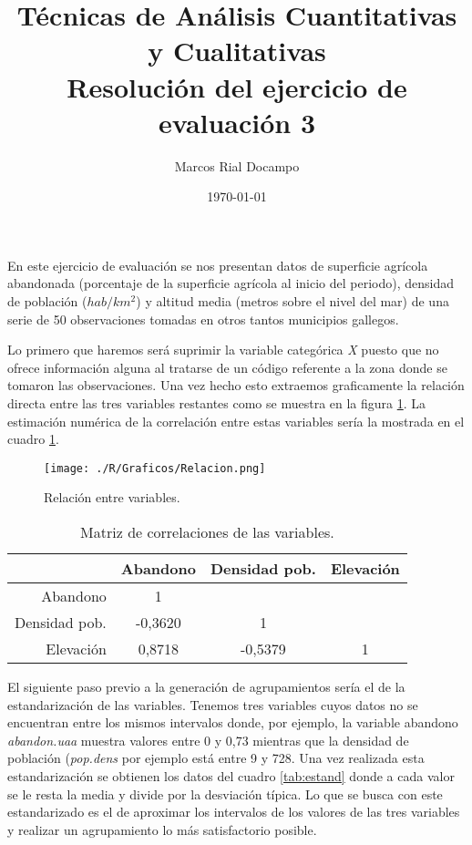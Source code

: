 \documentclass[11pt,a4paper]{article}
\author{Marcos Rial Docampo}
\title{Técnicas de Análisis Cuantitativas y Cualitativas\\Resolución del ejercicio de evaluación 3}
\date{\small{\today}}
\begin{document}
\maketitle

En este ejercicio de evaluación se nos presentan datos de superficie agrícola abandonada (porcentaje de la superficie agrícola al inicio del periodo), densidad de población ($hab/km^{2}$) y altitud media (metros sobre el nivel del mar) de una serie de 50 observaciones tomadas en otros tantos municipios gallegos.

Lo primero que haremos será suprimir la variable categórica \textit{X} puesto que no ofrece información alguna al tratarse de un código referente a la zona donde se tomaron las observaciones. Una vez hecho esto extraemos graficamente la relación directa entre las tres variables restantes como se muestra en la figura \ref{fig:relacion}. La estimación numérica de la correlación entre estas variables sería la mostrada en el cuadro \ref{tab:matrizcor}.

\begin{figure}
	\centering
	\texttt{[image: ./R/Graficos/Relacion.png]}
	\caption{Relación entre variables.}
	\label{fig:relacion}
\end{figure}

\begin{table}[ht]
\centering
\begin{tabular}{rccc}
\toprule[0.4mm]
 & Abandono & Densidad pob. & Elevación\\
\midrule
Abandono & 1 & & \\
Densidad pob. & -0,3620 & 1 & \\
Elevación & 0,8718 & -0,5379 & 1\\
\bottomrule[0.4mm]
\end{tabular}
\caption{Matriz de correlaciones de las variables.}
\label{tab:matrizcor}
\end{table}

El siguiente paso previo a la generación de agrupamientos sería el de la estandarización de las variables. Tenemos tres variables cuyos datos no se encuentran entre los mismos intervalos donde, por ejemplo, la variable abandono \textit{abandon.uaa} muestra valores entre 0 y 0,73 mientras que la densidad de población (\textit{pop.dens} por ejemplo está entre 9 y 728. Una vez realizada esta estandarización se obtienen los datos del cuadro \ref{tab:estand} donde a cada valor se le resta la media y divide por la desviación típica. Lo que se busca con este estandarizado es el de aproximar los intervalos de los valores de las tres variables y realizar un agrupamiento lo más satisfactorio posible.
\end{document}

